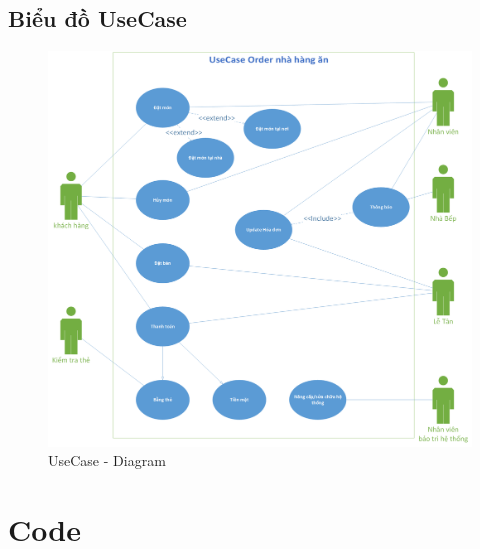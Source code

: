 \documentclass[a4paper,12pt]{report}
\begin{document}
\section{Biểu đồ UseCase}
	\begin{figure}[h]
		\centering
		\includegraphics[scale=0.2]{UseCase.png}
		\caption{UseCase - Diagram}
	\end{figure}

\chapter{Code}
\end{document}
